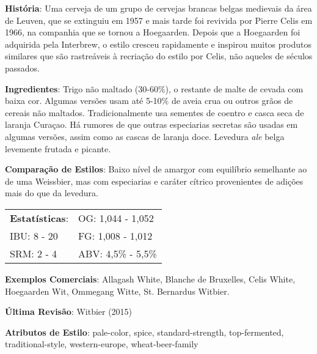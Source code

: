 \textbf{História}: Uma cerveja de um grupo de cervejas brancas belgas medievais da área de Leuven, que se extinguiu em 1957 e mais tarde foi revivida por Pierre Celis em 1966, na companhia que se tornou a Hoegaarden. Depois que a Hoegaarden foi adquirida pela Interbrew, o estilo cresceu rapidamente e inspirou muitos produtos similares que são rastreáveis à recriação do estilo por Celis, não aqueles de séculos passados.

\textbf{Ingredientes}: Trigo não maltado (30-60\%), o restante de malte de cevada com baixa cor. Algumas versões usam até 5-10\% de aveia crua ou outros grãos de cereais não maltados. Tradicionalmente usa sementes de coentro e casca seca de laranja Curaçao. Há rumores de que outras especiarias secretas são usadas em algumas versões, assim como as cascas de laranja doce. Levedura \textit{ale} belga levemente frutada e picante.

\textbf{Comparação de Estilos}: Baixo nível de amargor com equilíbrio semelhante ao de uma Weissbier, mas com especiarias e caráter cítrico provenientes de adições mais do que da levedura.

\begin{tabular}{@{}p{35mm}p{35mm}@{}}
  \textbf{Estatísticas}: & OG: 1,044 - 1,052 \\
  IBU: 8 - 20  & FG: 1,008 - 1,012  \\
  SRM: 2 - 4  & ABV: 4,5\% - 5,5\%
\end{tabular}

\textbf{Exemplos Comerciais}: Allagash White, Blanche de Bruxelles, Celis White, Hoegaarden Wit, Ommegang Witte, St. Bernardus Witbier.

\textbf{Última Revisão}: Witbier (2015)

\textbf{Atributos de Estilo}: pale-color, spice, standard-strength, top-fermented, traditional-style, western-europe, wheat-beer-family
